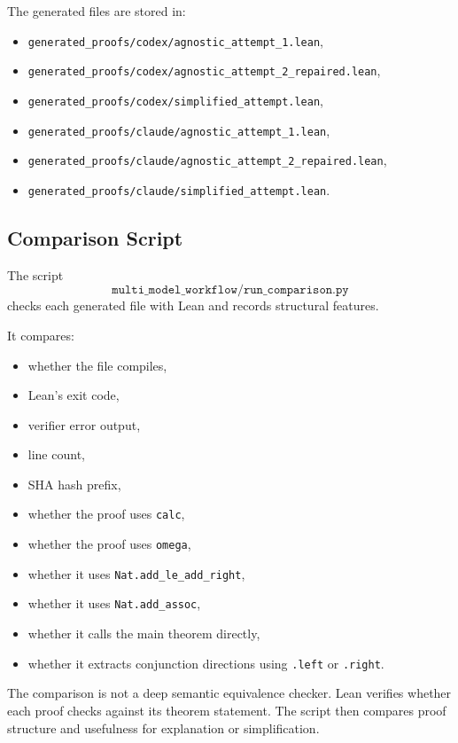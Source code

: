 \documentclass[11pt]{article}
\theoremstyle{definition}
\begin{document}
The generated files are stored in:
\begin{itemize}[leftmargin=*]
  \item \texttt{generated\_proofs/codex/agnostic\_attempt\_1.lean},
  \item \texttt{generated\_proofs/codex/agnostic\_attempt\_2\_repaired.lean},
  \item \texttt{generated\_proofs/codex/simplified\_attempt.lean},
  \item \texttt{generated\_proofs/claude/agnostic\_attempt\_1.lean},
  \item \texttt{generated\_proofs/claude/agnostic\_attempt\_2\_repaired.lean},
  \item \texttt{generated\_proofs/claude/simplified\_attempt.lean}.
\end{itemize}

\subsection{Comparison Script}

The script
\[
  \texttt{multi\_model\_workflow/run\_comparison.py}
\]
checks each generated file with Lean and records structural features.

It compares:
\begin{itemize}[leftmargin=*]
  \item whether the file compiles,
  \item Lean's exit code,
  \item verifier error output,
  \item line count,
  \item SHA hash prefix,
  \item whether the proof uses \texttt{calc},
  \item whether the proof uses \texttt{omega},
  \item whether it uses \texttt{Nat.add\_le\_add\_right},
  \item whether it uses \texttt{Nat.add\_assoc},
  \item whether it calls the main theorem directly,
  \item whether it extracts conjunction directions using \texttt{.left} or \texttt{.right}.
\end{itemize}

The comparison is not a deep semantic equivalence checker. Lean verifies whether
each proof checks against its theorem statement. The script then compares proof
structure and usefulness for explanation or simplification.
\end{document}
